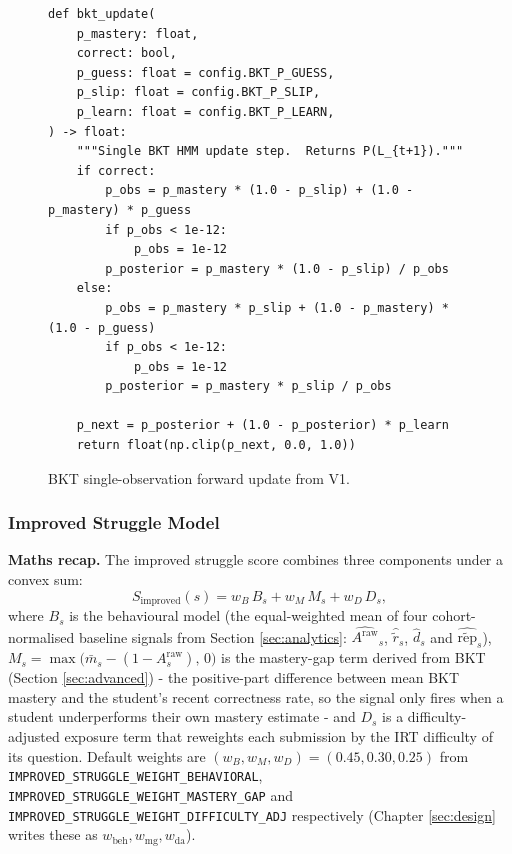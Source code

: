 \begin{figure}[H]
    \centering
    \begin{minipage}{0.92\linewidth}
\begin{lstlisting}[firstnumber=29]
def bkt_update(
    p_mastery: float,
    correct: bool,
    p_guess: float = config.BKT_P_GUESS,
    p_slip: float = config.BKT_P_SLIP,
    p_learn: float = config.BKT_P_LEARN,
) -> float:
    """Single BKT HMM update step.  Returns P(L_{t+1})."""
    if correct:
        p_obs = p_mastery * (1.0 - p_slip) + (1.0 - p_mastery) * p_guess
        if p_obs < 1e-12:
            p_obs = 1e-12
        p_posterior = p_mastery * (1.0 - p_slip) / p_obs
    else:
        p_obs = p_mastery * p_slip + (1.0 - p_mastery) * (1.0 - p_guess)
        if p_obs < 1e-12:
            p_obs = 1e-12
        p_posterior = p_mastery * p_slip / p_obs

    p_next = p_posterior + (1.0 - p_posterior) * p_learn
    return float(np.clip(p_next, 0.0, 1.0))
\end{lstlisting}
    \end{minipage}
    \caption{BKT single-observation forward update from V1.}
    \label{fig:code-bkt-update}
\end{figure}


\subsubsection{Improved Struggle Model}

\textbf{Maths recap.}
The improved struggle score combines three components under a convex sum:
\[
S_{\mathrm{improved}}(s) = w_B\, B_s + w_M\, M_s + w_D\, D_s,
\]
where $B_s$ is the behavioural model (the equal-weighted mean of four cohort-normalised baseline signals from Section \ref{sec:analytics}: $\widehat{A^{\mathrm{raw}}}_s$, $\hat{\tilde{r}}_s$, $\hat{d}_s$ and $\widehat{\tilde{\mathrm{rep}}}_s$), $M_s = \max\!\big(\bar{m}_s - (1 - A^{\mathrm{raw}}_s),\, 0\big)$ is the mastery-gap term derived from BKT (Section \ref{sec:advanced}) - the positive-part difference between mean BKT mastery and the student's recent correctness rate, so the signal only fires when a student underperforms their own mastery estimate - and $D_s$ is a difficulty-adjusted exposure term that reweights each submission by the IRT difficulty of its question.
Default weights are $(w_B, w_M, w_D) = (0.45, 0.30, 0.25)$ from \texttt{IMPROVED\_STRUGGLE\_WEIGHT\_BEHAVIORAL}, \texttt{IMPROVED\_STRUGGLE\_WEIGHT\_MASTERY\_GAP} and \texttt{IMPROVED\_STRUGGLE\_WEIGHT\_DIFFICULTY\_ADJ} respectively (Chapter \ref{sec:design} writes these as $w_{\mathrm{beh}}, w_{\mathrm{mg}}, w_{\mathrm{da}}$).

